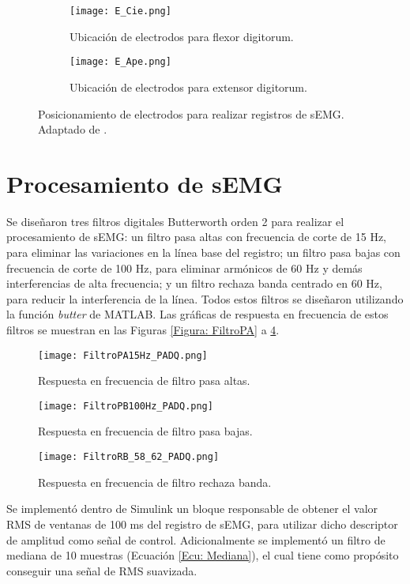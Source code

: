 \begin{figure}[htbp]
	\centering
	\begin{subfigure}[htbp]{0.3\textwidth}
		\texttt{[image: E\_Cie.png]}
		\caption{Ubicación de electrodos para flexor digitorum.}
		\label{Figura: E_Cie}
	\end{subfigure}
	\hspace{3cm}
	\begin{subfigure}[htbp]{0.3\textwidth}
		\texttt{[image: E\_Ape.png]}
		\caption{Ubicación de electrodos para extensor digitorum.}
		\label{Figura: E_Ape}
	\end{subfigure}
	\caption[Posicionamiento de electrodos para registro de sEMG]{Posicionamiento de electrodos para realizar registros de sEMG. Adaptado de \cite{Cavalcanti-Garcia2009}.}
	\label{Figura: E_sEMG}
\end{figure}


\section{Procesamiento de sEMG}
Se diseñaron tres filtros digitales Butterworth orden 2 para realizar el procesamiento de sEMG: un filtro pasa altas con frecuencia de corte de 15 Hz, para eliminar las variaciones en la línea base del registro; un filtro pasa bajas con frecuencia de corte de 100 Hz, para eliminar armónicos de 60 Hz y demás interferencias de alta frecuencia; y un filtro rechaza banda centrado en 60 Hz, para reducir la interferencia de la línea. Todos estos filtros se diseñaron utilizando la función \emph{butter} de MATLAB. Las gráficas de respuesta en frecuencia de estos filtros se muestran en las Figuras \ref{Figura: FiltroPA} a \ref{Figura: FiltroRB}.

\begin{figure}[htbp]
	\centering
	\texttt{[image: FiltroPA15Hz\_PADQ.png]}
	\caption{Respuesta en frecuencia de filtro pasa altas.}
	\label{Figura: FiltroPA}
	
	\texttt{[image: FiltroPB100Hz\_PADQ.png]}
	\caption{Respuesta en frecuencia de filtro pasa bajas.} 
	\label{Figura: FiltroPB}
	
	\texttt{[image: FiltroRB\_58\_62\_PADQ.png]}
	\caption{Respuesta en frecuencia de filtro rechaza banda.}
	\label{Figura: FiltroRB}
\end{figure}

Se implementó dentro de Simulink un bloque responsable de obtener el valor RMS de ventanas de 100 ms del registro de sEMG, para utilizar dicho descriptor de amplitud como señal de control. Adicionalmente se implementó un filtro de mediana de 10 muestras (Ecuación \ref{Ecu: Mediana}), el cual tiene como propósito conseguir una señal de RMS suavizada.


